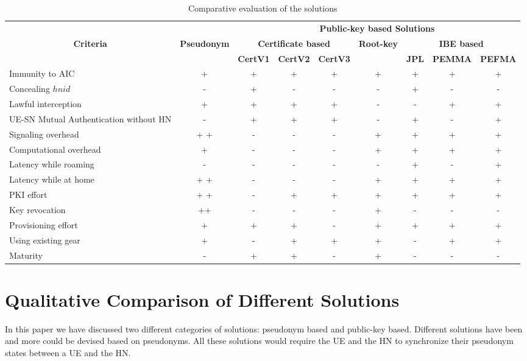\documentclass{river-journal}
\begin{document}
\begin{table}
\begin{center}
\caption{Comparative evaluation of the solutions}
\begin{tabular}[t]{|l|c|c|c|c|c|c|c|c|}
\hline
\multicolumn{1}{|c|}{} & \multicolumn{1}{|c|}{} & \multicolumn{7}{|c|}{\textbf{Public-key based Solutions}}\\
\cline{3-9}
\multicolumn{1}{|c|}{\textbf{Criteria}} & \multicolumn{1}{|c|}{\textbf{Pseudonym}} & \multicolumn{3}{|c|}{\textbf{Certificate based}} & \multicolumn{1}{|c|}{\textbf{Root-key}} & \multicolumn{3}{|c|}{\textbf{IBE based}}\\
\cline{3-5} \cline{7-9}
\textbf{} &  & \textbf{CertV1} & \textbf{CertV2} & \textbf{CertV3} & \textbf{} & \textbf{JPL} & \textbf{PEMMA} & \textbf{PEFMA}\\
\hline \hline
Immunity to AIC & + & + & + & + & + & + & + & + \\ \hline
Concealing $hnid$ & - & + & - & - & - & + & - & - \\ \hline
Lawful interception & + & + & + & + & - & - & + & + \\ \hline
UE-SN Mutual Authentication without HN & - & + & + & + & - & + & - & + \\ \hline
Signaling overhead & + + & - & - & - & + & + & + & + \\ \hline
Computational overhead & + & - & - & - & + & + & + & + \\ \hline
Latency while roaming & - & - & -  & - & - & + & - & + \\ \hline
Latency while at home & + + & - & -  & - & + & + & + & + \\ \hline
PKI effort & + + &  - & + & + & + & + & + & + \\ \hline
Key revocation & ++ & - & - & - & + & - & - & - \\ \hline
Provisioning effort & + & + & + & - & + & + & + & + \\ \hline
Using existing gear & + & - & + & + & + & - & + & + \\ \hline
Maturity  & - & + & + & - & + & - & - & - \\ \hline
\end{tabular}
\label{table:comparison}
\end{center}
\end{table}



\section{Qualitative Comparison of Different Solutions}
\label{sec:evaluation}
In this paper we have discussed two different categories of solutions: pseudonym based and public-key based. Different solutions \cite{pseudonym_valtteri_philip,pseudonym_ericsson,CCS15,SSR15} have been and more could be devised based on pseudonyms. All these solutions would require the UE and the HN to synchronize their pseudonym states between a UE and the HN.
\end{document}

